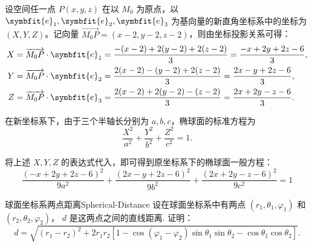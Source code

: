 \begin{solution}
    设空间任一点 $P(x, y, z)$ 在以 $M_0$ 为原点，以 $\symbfit{e}_1, \symbfit{e}_2, \symbfit{e}_3$ 为基向量的新直角坐标系中的坐标为 $(X,\allowbreak Y,\allowbreak Z)$。记向量 $\overrightarrow{M_0 P} = (x - 2, y - 2, z - 2)$，则由坐标投影关系可得：
    \begin{equation}
        \begin{aligned}
            X & = \overrightarrow{M_0 P} \cdot \symbfit{e}_1 = \frac{-(x - 2) + 2(y - 2) + 2(z - 2)}{3} = \frac{-x + 2y + 2z - 6}{3}, \\
            Y & = \overrightarrow{M_0 P} \cdot \symbfit{e}_2 = \frac{2(x - 2) - (y - 2) + 2(z - 2)}{3} = \frac{2x - y + 2z - 6}{3},   \\
            Z & = \overrightarrow{M_0 P} \cdot \symbfit{e}_3 = \frac{2(x - 2) + 2(y - 2) - (z - 2)}{3} = \frac{2x + 2y - z - 6}{3}.
        \end{aligned}
    \end{equation}

    在新坐标系下，由于三个半轴长分别为 $a, b, c$，椭球面的标准方程为
    \begin{equation}
        \frac{X^2}{a^2} + \frac{Y^2}{b^2} + \frac{Z^2}{c^2} = 1.
    \end{equation}

    将上述 $X, Y, Z$ 的表达式代入，即可得到原坐标系下的椭球面一般方程：
    \begin{equation}
        \boxed{\frac{(-x + 2y + 2z - 6)^2}{9a^2} + \frac{(2x - y + 2z - 6)^2}{9b^2} + \frac{(2x + 2y - z - 6)^2}{9c^2} = 1}
    \end{equation}
\end{solution}


\begin{problem}{球面坐标系两点距离}{Spherical-Distance}
    设在球面坐标系中有两点 $(r_1, \theta_1, \varphi_1)$ 和 $(r_2, \theta_2, \varphi_2)$， $d$ 是这两点之间的直线距离. 证明：
    \begin{equation}
        d = \sqrt{(r_1 - r_2)^2 + 2r_1 r_2 [1 - \cos(\varphi_1 - \varphi_2) \sin\theta_1 \sin\theta_2 - \cos\theta_1 \cos\theta_2]}.
    \end{equation}
\end{problem}

